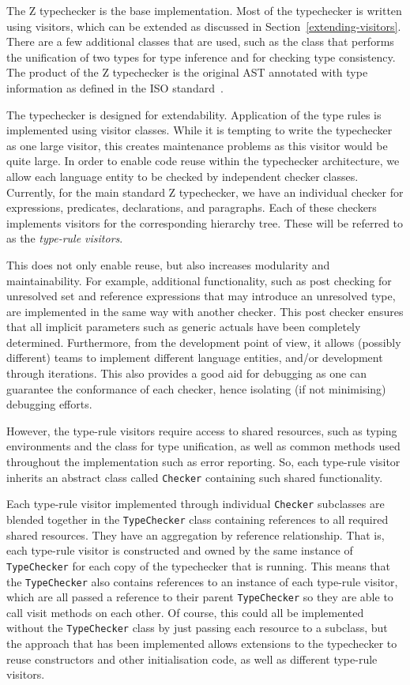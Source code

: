 \documentclass{llncs}
\begin{document}
The Z typechecker is the base implementation. Most of the typechecker
is written using visitors, which can be extended as discussed in
Section~\ref{extending-visitors}. There are a few additional classes
that are used, such as the class that performs the unification of two
types for type inference and for checking type consistency.
The product of the Z typechecker is the original AST annotated with type
information as defined in the ISO standard~\cite[Section~10]{isoz}.

The typechecker is designed for extendability. Application of the type
rules is implemented using visitor classes. While it is tempting to
write the typechecker as one large visitor, this creates maintenance
problems as this visitor would be quite large.
In order to enable code reuse within the typechecker architecture, we
allow each language entity to be checked by independent checker classes.
Currently, for the main standard Z typechecker, we have an individual checker
for expressions, predicates, declarations, and paragraphs. Each of these checkers
implements visitors for the corresponding hierarchy tree.
These will be referred to as the {\em type-rule visitors}.

This does not only enable reuse, but also increases modularity and
maintainability.  For example, additional functionality, such as post
checking for unresolved set and reference expressions that may
introduce an unresolved type, are implemented in the same way with
another checker. This post checker ensures that all implicit
parameters such as generic actuals have been completely determined.
Furthermore, from the development point of view, it allows (possibly
different) teams to implement different language entities, and/or
development through iterations.  This also provides a good aid for
debugging as one can guarantee the conformance of each checker, hence
isolating (if not minimising) debugging efforts.

However, the type-rule visitors require access to shared resources,
such as typing environments and the class for type unification, as well as
common methods used throughout the implementation such as error reporting.
So, each type-rule visitor inherits an abstract class called {\tt Checker}
containing such shared functionality.

Each type-rule visitor implemented through individual {\tt Checker}
subclasses are blended together in the {\tt TypeChecker} class
containing references to all required shared resources. They have an
aggregation by reference relationship.  That is, each type-rule
visitor is constructed and owned by the same instance of {\tt
TypeChecker} for each copy of the typechecker that is running.  This
means that the {\tt TypeChecker} also contains references to an
instance of each type-rule visitor, which are all passed a reference
to their parent {\tt TypeChecker} so they are able to call visit
methods on each other.  Of course, this could all be implemented
without the {\tt TypeChecker} class by just passing each resource to a
subclass, but the approach that has been implemented allows extensions
to the typechecker to reuse constructors and other initialisation
code, as well as different type-rule visitors.
\end{document}
